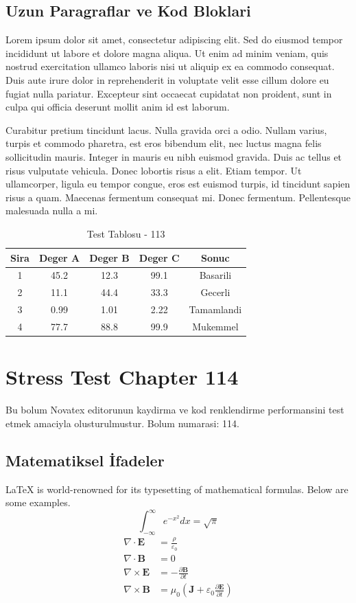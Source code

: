 \documentclass[12pt,a4paper]{article}
\begin{document}
\subsection{Uzun Paragraflar ve Kod Bloklari}
Lorem ipsum dolor sit amet, consectetur adipiscing elit. Sed do eiusmod tempor incididunt ut labore et dolore magna aliqua. Ut enim ad minim veniam, quis nostrud exercitation ullamco laboris nisi ut aliquip ex ea commodo consequat. Duis aute irure dolor in reprehenderit in voluptate velit esse cillum dolore eu fugiat nulla pariatur. Excepteur sint occaecat cupidatat non proident, sunt in culpa qui officia deserunt mollit anim id est laborum.

Curabitur pretium tincidunt lacus. Nulla gravida orci a odio. Nullam varius, turpis et commodo pharetra, est eros bibendum elit, nec luctus magna felis sollicitudin mauris. Integer in mauris eu nibh euismod gravida. Duis ac tellus et risus vulputate vehicula. Donec lobortis risus a elit. Etiam tempor. Ut ullamcorper, ligula eu tempor congue, eros est euismod turpis, id tincidunt sapien risus a quam. Maecenas fermentum consequat mi. Donec fermentum. Pellentesque malesuada nulla a mi.

\begin{table}[h!]
\centering
\begin{tabular}{|c|c|c|c|c|}
\hline
\textbf{Sira} & \textbf{Deger A} & \textbf{Deger B} & \textbf{Deger C} & \textbf{Sonuc} \\
\hline
1 & 45.2 & 12.3 & 99.1 & Basarili \\
2 & 11.1 & 44.4 & 33.3 & Gecerli \\
3 & 0.99 & 1.01 & 2.22 & Tamamlandi \\
4 & 77.7 & 88.8 & 99.9 & Mukemmel \\
\hline
\end{tabular}
\caption{Test Tablosu - 113}
\end{table}

\newpage
\section{Stress Test Chapter 114}
Bu bolum Novatex editorunun kaydirma ve kod renklendirme performansini test etmek amaciyla olusturulmustur. Bolum numarasi: 114.

\subsection{Matematiksel İfadeler}
\LaTeX{} is world-renowned for its typesetting of mathematical formulas. Below are some examples.
\begin{equation}
\int_{-\infty}^{\infty} e^{-x^2} dx = \sqrt{\pi}
\end{equation}
\begin{align}
\nabla \cdot \mathbf{E} &= \frac{\rho}{\varepsilon_0} \\
\nabla \cdot \mathbf{B} &= 0 \\
\nabla \times \mathbf{E} &= -\frac{\partial \mathbf{B}}{\partial t} \\
\nabla \times \mathbf{B} &= \mu_0\left(\mathbf{J} + \varepsilon_0 \frac{\partial \mathbf{E}}{\partial t}\right)
\end{align}
\end{document}
